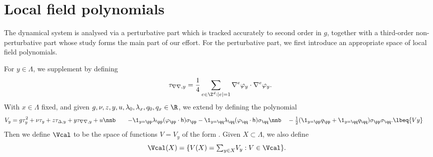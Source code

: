 
\section{Local field polynomials}

The dynamical system is analysed via a perturbative part which is tracked accurately
to second order in $g$, together with a third-order non-perturbative part whose study
forms the main part of our effort.  For the perturbative part, we first introduce
an appropriate space of local field polynomials.

For $y \in \Lambda$, we supplement  by defining
\begin{equation}
\label{e:tauphi2}
\quad \tau_{\nabla\nabla,y}
= \frac{1}{4} \sum_{e\in\Z^d:|e| = 1} \nabla^e \varphi_y \cdot \nabla^e \varphi_y.
\end{equation}
With $x \in \Lambda$ fixed, and
given $g,\nu,z,y,u,\lambda_0,\lambda_x,q_0,q_x \in \R$, we extend
by defining the polynomial
\begin{align}
    V_y &= g \tau_y^2 + \nu \tau_y + z \tau_{\Delta,y} + y \tau_{\nabla\nabla,y} + u
    \nnb
    & \quad
    - \1_{y=\pp}\lambda_{\pp}(\varphi_{\pp} \cdot {\sf h})\sigma_\pp
    - \1_{y=\qq}\lambda_{\qq}(\varphi_{\qq} \cdot {\sf h})\sigma_\qq
     \nnb
    & \quad
    - \textstyle{\frac 12} (\1_{y=\pp} q_\pp + \1_{y=\qq}q_\qq )\sigma_\pp\sigma_\qq .
\lbeq{Vy}
\end{align}
Then we define $\Vcal$ to be the space of functions $V=V_y$ of the form .
Given $X \subset \Lambda$, we also define
\begin{equation}
\label{e:Vcalesig}
    \Vcal(X) = \{V(X) = \textstyle{\sum_{y\in X}} V_y : V \in \Vcal \}.
\end{equation}


